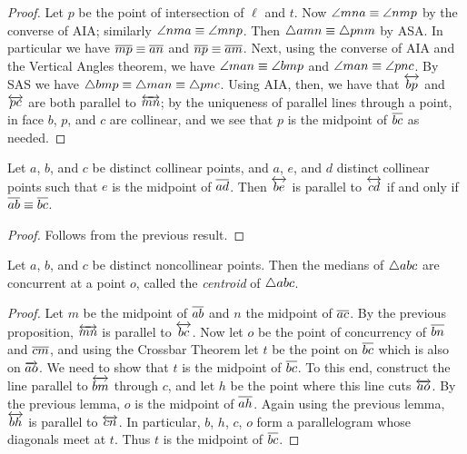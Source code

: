 \begin{proof}
Let \(p\) be the point of intersection of \(\ell\) and \(t\).
Now \(\angle{mna} \equiv \angle{nmp}\) by the converse of AIA; similarly \(\angle{nma} \equiv \angle{mnp}\).
Then \(\bigtriangleup{amn} \equiv \bigtriangleup{pnm}\) by ASA.
In particular we have \(\overline{mp} \equiv \overline{an}\) and \(\overline{np} \equiv \overline{am}\).
Next, using the converse of AIA and the Vertical Angles theorem, we have \(\angle{man} \equiv \angle{bmp}\) and \(\angle{man} \equiv \angle{pnc}\).
By SAS we have \(\bigtriangleup{bmp} \equiv \bigtriangleup{man} \equiv \bigtriangleup{pnc}\).
Using AIA, then, we have that \(\overleftrightarrow{bp}\) and \(\overleftrightarrow{pc}\) are both parallel to \(\overleftrightarrow{mn}\); by the uniqueness of parallel lines through a point, in face \(b\), \(p\), and \(c\) are collinear, and we see that \(p\) is the midpoint of \(\overline{bc}\) as needed.
\end{proof}

\begin{lem}\label{lem:parallel-bisector}
Let \(a\), \(b\), and \(c\) be distinct collinear points, and \(a\), \(e\), and \(d\) distinct collinear points such that \(e\) is the midpoint of \(\overline{ad}\).
Then \(\overleftrightarrow{be}\) is parallel to \(\overleftrightarrow{cd}\) if and only if \(\overline{ab} \equiv \overline{bc}\).
\end{lem}

\begin{proof}
Follows from the previous result.
\end{proof}

\begin{cor}
Let \(a\), \(b\), and \(c\) be distinct noncollinear points.
Then the medians of \(\bigtriangleup{abc}\) are concurrent at a point \(o\), called the \emph{centroid} of \(\bigtriangleup{abc}\).
\end{cor}

\begin{proof}
Let \(m\) be the midpoint of \(\overline{ab}\) and \(n\) the midpoint of \(\overline{ac}\).
By the previous proposition, \(\overleftrightarrow{mn}\) is parallel to \(\overleftrightarrow{bc}\).
Now let \(o\) be the point of concurrency of \(\overline{bn}\) and \(\overline{cm}\), and using the Crossbar Theorem let \(t\) be the point on \(\overline{bc}\) which is also on \(\overrightarrow{ao}\).
We need to show that \(t\) is the midpoint of \(\overline{bc}\).
To this end, construct the line parallel to \(\overleftrightarrow{bm}\) through \(c\), and let \(h\) be the point where this line cuts \(\overleftrightarrow{ao}\).
By the previous lemma, \(o\) is the midpoint of \(\overline{ah}\).
Again using the previous lemma, \(\overleftrightarrow{bh}\) is parallel to \(\overleftrightarrow{cn}\).
In particular, \(b\), \(h\), \(c\), \(o\) form a parallelogram whose diagonals meet at \(t\).
Thus \(t\) is the midpoint of \(\overline{bc}\).
\end{proof}


